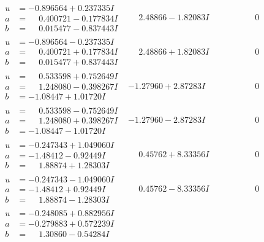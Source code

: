 \documentclass[1p]{elsarticle_modified}
\theoremstyle{definition}
\begin{document}
$$\begin{array}{c|c|c}
\begin{aligned}
u &= -0.896564 + 0.237335 I \\
a &= \phantom{-}0.400721 - 0.177834 I \\
b &= \phantom{-}0.015477 - 0.837443 I\end{aligned}
 & \phantom{-}2.48866 - 1.82083 I & \phantom{-0.000000 } 0 \\ \hline\begin{aligned}
u &= -0.896564 - 0.237335 I \\
a &= \phantom{-}0.400721 + 0.177834 I \\
b &= \phantom{-}0.015477 + 0.837443 I\end{aligned}
 & \phantom{-}2.48866 + 1.82083 I & \phantom{-0.000000 } 0 \\ \hline\begin{aligned}
u &= \phantom{-}0.533598 + 0.752649 I \\
a &= \phantom{-}1.248080 - 0.398267 I \\
b &= -1.08447 + 1.01720 I\end{aligned}
 & -1.27960 + 2.87283 I & \phantom{-0.000000 } 0 \\ \hline\begin{aligned}
u &= \phantom{-}0.533598 - 0.752649 I \\
a &= \phantom{-}1.248080 + 0.398267 I \\
b &= -1.08447 - 1.01720 I\end{aligned}
 & -1.27960 - 2.87283 I & \phantom{-0.000000 } 0 \\ \hline\begin{aligned}
u &= -0.247343 + 1.049060 I \\
a &= -1.48412 - 0.92449 I \\
b &= \phantom{-}1.88874 + 1.28303 I\end{aligned}
 & \phantom{-}0.45762 + 8.33356 I & \phantom{-0.000000 } 0 \\ \hline\begin{aligned}
u &= -0.247343 - 1.049060 I \\
a &= -1.48412 + 0.92449 I \\
b &= \phantom{-}1.88874 - 1.28303 I\end{aligned}
 & \phantom{-}0.45762 - 8.33356 I & \phantom{-0.000000 } 0 \\ \hline\begin{aligned}
u &= -0.248085 + 0.882956 I \\
a &= -0.279883 + 0.572239 I \\
b &= \phantom{-}1.30860 - 0.54284 I\end{aligned}

\end{array}$$
\end{document}
